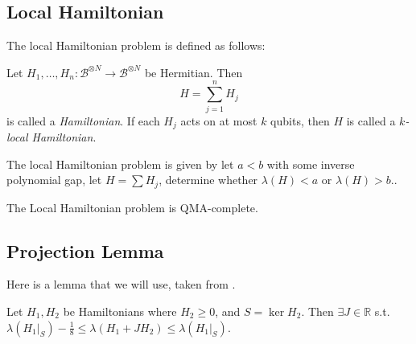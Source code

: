 \subsection{Local Hamiltonian}

The local Hamiltonian problem is defined as follows:

\begin{definition}
	Let $H_1, \ldots, H_n:\mathcal{B}^{\otimes N}\rightarrow\mathcal{B}^{\otimes N}$ be Hermitian. Then $$H=\sum_{j=1}^nH_j$$ is called a \emph{Hamiltonian}.
	If each $H_j$ acts on at most $k$ qubits, then $H$ is called a \emph{$k$-local Hamiltonian}.
\end{definition}

The local Hamiltonian problem is given by let $a<b$ with some inverse polynomial gap, let $H=\sum H_j$, determine whether $\lambda(H)<a$ or $\lambda(H)>b$..

\begin{theorem}
	The Local Hamiltonian problem is QMA-complete.
\end{theorem}

\subsection{Projection Lemma}

Here is a lemma that we will use, taken from \cite{kempe_kitaev_regev_2006}.

Let $H_1, H_2$ be Hamiltonians where $H_2\geq0$, and $S=\ker H_2$.
Then $\exists J\in\mathbb{R}$ s.t.
$\lambda(H_1\big|_S)-\frac{1}{8}\leq
	\lambda(H_1+JH_2)\leq\lambda(H_1\big|_S)$.


